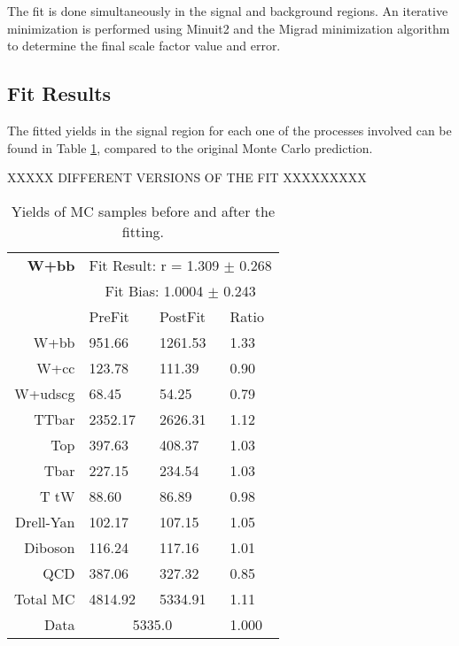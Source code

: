The fit is done simultaneously in the signal and background regions. An iterative 
minimization is performed using Minuit2 and the Migrad minimization 
algorithm to determine the final scale factor value and error. \cite{MNUserGuide}

\subsection{Fit Results \label{sec:SignalExtraction}}

The fitted yields in the signal region for each one of the processes involved can be found in Table \ref{tab:fitYields}, compared to the
original Monte Carlo prediction. 

XXXXX DIFFERENT VERSIONS OF THE FIT XXXXXXXXX

\begin{table}[htb]
\begin{center}
\begin{tabular}{r|l|l|l}
\bf{W+bb} & \multicolumn{3}{c}{Fit Result: r = 1.309 $\pm$ 0.268}\\
{} & \multicolumn{3}{c}{Fit Bias: 1.0004 $\pm$ 0.243}\\
{}         & PreFit  & PostFit & Ratio \\ \hline
W+bb       & 951.66  & 1261.53 & 1.33\\
W+cc       & 123.78  & 111.39  & 0.90\\
W+udscg    & 68.45   & 54.25   & 0.79\\
TTbar      & 2352.17 & 2626.31 & 1.12\\
Top        & 397.63  & 408.37  & 1.03\\
Tbar       & 227.15  & 234.54  & 1.03\\
T tW       & 88.60   & 86.89   & 0.98\\
Drell-Yan  & 102.17  & 107.15  & 1.05\\
Diboson    & 116.24  & 117.16  & 1.01\\
QCD        & 387.06  & 327.32  & 0.85\\
Total MC   & 4814.92 & 5334.91 & 1.11\\
\hline \hline
Data  & \multicolumn{2}{c|}{5335.0} & 1.000
\end{tabular}
\caption{Yields of MC samples before and after the fitting.}
\label{tab:fitYields}
\end{center}
\end{table}


